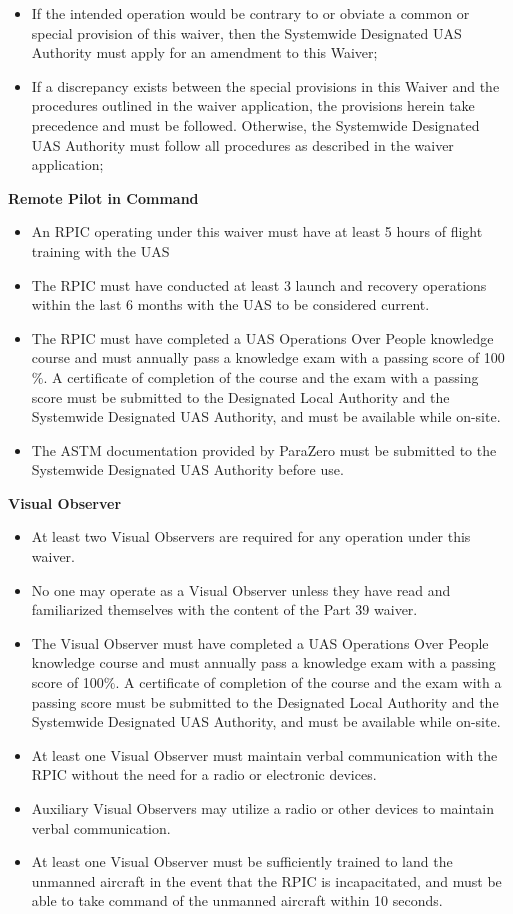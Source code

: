 \documentclass[
]{book}
\providecommand{\tightlist}{%
  \setlength{\itemsep}{0pt}\setlength{\parskip}{0pt}}
\begin{document}
\begin{itemize}
\item
  If the intended operation would be contrary to or obviate a common or special provision of this waiver, then the Systemwide Designated UAS Authority must apply for an amendment to this Waiver;
\item
  If a discrepancy exists between the special provisions in this Waiver and the procedures outlined in the waiver application, the provisions herein take precedence and must be followed. Otherwise, the Systemwide Designated UAS Authority must follow all procedures as described in the waiver application;
\end{itemize}

\textbf{Remote Pilot in Command}

\begin{itemize}
\tightlist
\item
  An RPIC operating under this waiver must have at least 5 hours of flight training with the UAS
\item
  The RPIC must have conducted at least 3 launch and recovery operations within the last 6 months with the UAS to be considered current.
\item
  The RPIC must have completed a UAS Operations Over People knowledge course and must annually pass a knowledge exam with a passing score of 100\(\%\). A certificate of completion of the course and the exam with a passing score must be submitted to the Designated Local Authority and the Systemwide Designated UAS Authority, and must be available while on-site.
\item
  The ASTM documentation provided by ParaZero must be submitted to the Systemwide Designated UAS Authority before use.
\end{itemize}

\textbf{Visual Observer}

\begin{itemize}
\tightlist
\item
  At least two Visual Observers are required for any operation under this waiver.
\item
  No one may operate as a Visual Observer unless they have read and familiarized themselves with the content of the Part 39 waiver.
\item
  The Visual Observer must have completed a UAS Operations Over People knowledge course and must annually pass a knowledge exam with a passing score of 100\(\%\). A certificate of completion of the course and the exam with a passing score must be submitted to the Designated Local Authority and the Systemwide Designated UAS Authority, and must be available while on-site.
\item
  At least one Visual Observer must maintain verbal communication with the RPIC without the need for a radio or electronic devices.
\item
  Auxiliary Visual Observers may utilize a radio or other devices to maintain verbal communication.
\item
  At least one Visual Observer must be sufficiently trained to land the unmanned aircraft in the event that the RPIC is incapacitated, and must be able to take command of the unmanned aircraft within 10 seconds.
\end{itemize}
\end{document}
